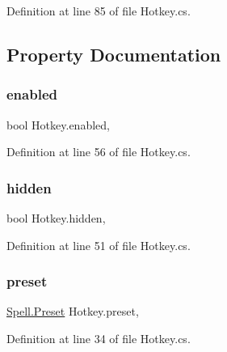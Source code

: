 Definition at line 85 of file Hotkey.\+cs.



\subsection{Property Documentation}
\mbox{\label{class_hotkey_a91d3325ffb1aa3fd83dbe59f6630b796}} 
\subsubsection{\texorpdfstring{enabled}{enabled}}
{\footnotesize\ttfamily bool Hotkey.\+enabled\hspace{0.3cm}{\ttfamily [get]}, {\ttfamily [set]}}



Definition at line 56 of file Hotkey.\+cs.

\mbox{\label{class_hotkey_aff210fac7bfb6cfdf469b02d6cd7e71a}} 
\subsubsection{\texorpdfstring{hidden}{hidden}}
{\footnotesize\ttfamily bool Hotkey.\+hidden\hspace{0.3cm}{\ttfamily [get]}, {\ttfamily [set]}}



Definition at line 51 of file Hotkey.\+cs.

\mbox{\label{class_hotkey_a98f88450edff67278329260ff2e5ce2b}} 
\subsubsection{\texorpdfstring{preset}{preset}}
{\footnotesize\ttfamily \mbox{\hyperlink{class_spell_a5520e850e7000a6156b3456672b72ed1}{Spell.\+Preset}} Hotkey.\+preset\hspace{0.3cm}{\ttfamily [get]}, {\ttfamily [set]}}



Definition at line 34 of file Hotkey.\+cs.

\mbox{\label{class_hotkey_a960d18fbb18716a6cb3db53b46981cd1}} 
